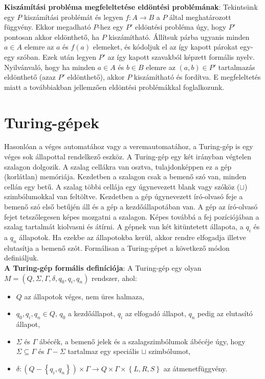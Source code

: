 \documentclass[margin=0px]{article}
\begin{document}
\noindent \textbf{Kiszámítási probléma megfeleltetése eldöntési problémának}: Tekintsünk egy $P$ kiszámítási problémát
és legyen $f: A \to B$ a $P$ által meghatározott függvény. Ekkor megadható $P$-hez egy $P'$ eldöntési probléma úgy, hogy
$P'$ pontosan akkor eldönthető, ha $P$ kiszámítható. Állítsuk párba ugyanis minden $a \in A$ elemre az $a$ és $f(a)$ elemeket,
és kódoljuk el az így kapott párokat egy-egy szóban. Ezek után legyen $P'$ az így kapott szavakból képzett formális nyelv.
Nyilvánvaló, hogy ha minden $a \in A$ és $b \in B$ elemre az $(a,b) \in P'$ tartalmazás eldönthető (azaz $P'$ eldönthető), akkor
$P$ kiszámítható és fordítva.
E megfeleltetés miatt a továbbiakban jellemzően eldöntési problémákkal foglalkozunk.

\section{Turing-gépek}

Hasonlóan a véges automatához vagy a veremautomatához, a Turing-gép is
egy véges sok állapottal rendelkező eszköz. A Turing-gép egy két irányban
végtelen szalagon dolgozik. A szalag cellákra van osztva, tulajdonképpen ez
a gép (korlátlan) memóriája. Kezdetben a szalagon csak a bemenő szó van,
minden cellán egy betű. A szalag többi cellája egy úgynevezett blank vagy
szóköz ($\sqcup$) szimbólumokkal van feltöltve. Kezdetben a gép úgynevezett író-olvasó
feje a bemenő szó első betűjén áll és a gép a kezdőállapotában van.
A gép az író-olvasó fejet tetszőlegesen képes mozgatni a szalagon. Képes továbbá
a fej pozíciójában a szalag tartalmát kiolvasni és átírni. A gépnek van két
kitüntetett állapota, a $q_{i}$ és a $q_{n}$ állapotok. Ha ezekbe az állapotokba kerül,
akkor rendre elfogadja illetve elutasítja a bemenő szót.
Formálisan a Turing-gépet a következő módon definiáljuk.\\

\noindent \textbf{A Turing-gép formális definíciója}: A Turing-gép egy olyan
$M = (Q, \Sigma, \Gamma, \delta, q_{0}, q_{i}, q_{n})$ rendszer, ahol:

\begin{itemize}

    \item	$Q$ az állapotok véges, nem üres halmaza,

    \item	$q_{0}, q_{i}, q_{n} \in Q$, $q_{0}$ a kezdőállapot, $q_{i}$ az elfogadó állapot,
          $q_{n}$ pedig az elutasító állapot,

    \item	$\Sigma$ és $\Gamma$ ábécék, a bemenő jelek és a szalagszimbólumok ábécéje úgy, hogy
          $\Sigma \subseteq \Gamma$ és $\Gamma - \Sigma$ tartalmaz egy speciális $\sqcup$ szimbólumot,

    \item	$\delta : (Q - \left\{q_{i},q_{n}\right\}) \times \Gamma \to Q \times \Gamma \times \left\{L, R, S\right\}$
          az átmenetfüggvény.

\end{itemize}
\end{document}
